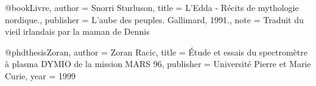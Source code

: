 
@book{Livre,
			author = {Snorri Sturluson},
			title = {L'Edda - Récits de mythologie nordique.},
			publisher = {L'aube des peuples. Gallimard, 1991.},
			note = {Traduit du vieil irlandais par la maman de Dennis}
}			

@phdthesis{Zoran,
        author = {Zoran Racic},
        title = {\'Etude et essais du spectromètre à plasma {DYMIO} de la  mission {MARS 96}},
        publisher = {Université Pierre et Marie Curie},
        year = {1999}
}
